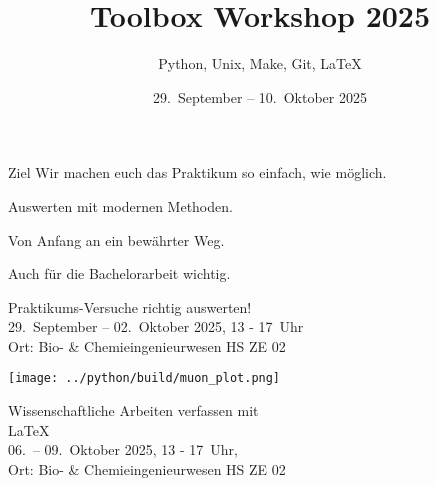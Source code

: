 

\title[Toolbox 2025]{Toolbox Workshop 2025}
\subtitle{Python, Unix, Make, Git, \LaTeX{}}
\date{29.~September – 10.~Oktober 2025}
\author[Toolbox Workshop Team]{}



\maketitle

\begin{frame}{Ziel}
  \setlength\parskip{3ex}
  \huge
  Wir machen euch das Praktikum so einfach, wie möglich.

  Auswerten mit modernen Methoden.

  Von Anfang an ein bewährter Weg.

  Auch für die Bachelorarbeit wichtig.
\end{frame}

\begin{frame}
  \vspace{0.7cm}
  \begin{center}
    \huge Praktikums-Versuche richtig auswerten!\\
    29.~September – 02.~Oktober 2025, 13 - 17~Uhr\\%
    Ort: Bio- \& Chemieingenieurwesen HS ZE 02
  \end{center}
\end{frame}

\begin{frame}[plain]
  \centering
  \texttt{[image: ../python/build/muon\_plot.png]}
\end{frame}

\begin{frame}
  \begin{center}
    \huge Wissenschaftliche Arbeiten verfassen mit \\[0.5\baselineskip]
    \textrm{\fontsize{80}{120}\selectfont\LaTeX{}}\\[0.5\baselineskip]
    06.~– 09.~Oktober 2025, 13 - 17~Uhr,\\
    Ort: Bio- \& Chemieingenieurwesen HS ZE 02
  \end{center}
\end{frame}

